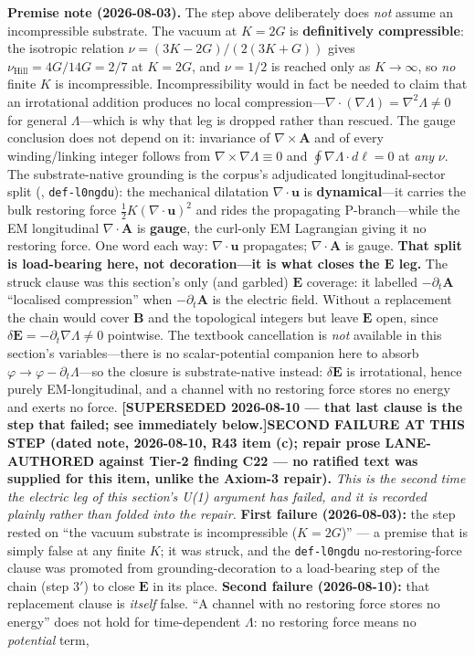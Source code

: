 \noindent\textbf{Premise note (2026-08-03).} The step above deliberately does \emph{not} assume an incompressible substrate. The vacuum at $K = 2G$ is \textbf{definitively compressible}: the isotropic relation $\nu = (3K - 2G)/(2(3K+G))$ gives $\nu_{\text{Hill}} = 4G/14G = 2/7$ at $K = 2G$, and $\nu = 1/2$ is reached only as $K \to \infty$, so \emph{no} finite $K$ is incompressible. Incompressibility would in fact be needed to claim that an irrotational addition produces no local compression---$\nabla\cdot(\nabla\Lambda) = \nabla^2\Lambda \neq 0$ for general $\Lambda$---which is why that leg is dropped rather than rescued. The gauge conclusion does not depend on it: invariance of $\nabla\times\mathbf{A}$ and of every winding/linking integer follows from $\nabla\times\nabla\Lambda \equiv 0$ and $\oint\nabla\Lambda\cdot d\boldsymbol{\ell} = 0$ at \emph{any} $\nu$. The substrate-native grounding is the corpus's adjudicated longitudinal-sector split (, \texttt{def-l0ngdu}): the mechanical dilatation $\nabla\cdot\mathbf{u}$ is \textbf{dynamical}---it carries the bulk restoring force $\tfrac12 K(\nabla\cdot\mathbf{u})^2$ and rides the propagating P-branch---while the EM longitudinal $\nabla\cdot\mathbf{A}$ is \textbf{gauge}, the curl-only EM Lagrangian giving it no restoring force. One word each way: $\nabla\cdot\mathbf{u}$ propagates; $\nabla\cdot\mathbf{A}$ is gauge. \textbf{That split is load-bearing here, not decoration---it is what closes the $\mathbf{E}$ leg.} The struck clause was this section's only (and garbled) $\mathbf{E}$ coverage: it labelled $-\partial_t\mathbf{A}$ ``localised compression'' when $-\partial_t\mathbf{A}$ is the electric field. Without a replacement the chain would cover $\mathbf{B}$ and the topological integers but leave $\mathbf{E}$ open, since $\delta\mathbf{E} = -\partial_t\nabla\Lambda \neq 0$ pointwise. The textbook cancellation is \emph{not} available in this section's variables---there is no scalar-potential companion here to absorb $\varphi \to \varphi - \partial_t\Lambda$---so the closure is substrate-native instead: $\delta\mathbf{E}$ is irrotational, hence purely EM-longitudinal, and a channel with no restoring force stores no energy and exerts no force. \textbf{[SUPERSEDED 2026-08-10 --- that last clause is the step that failed; see immediately below.]}\quad \textbf{SECOND FAILURE AT THIS STEP (dated note, 2026-08-10, R43 item (c); repair prose LANE-AUTHORED against Tier-2 finding C22 --- no ratified text was supplied for this item, unlike the Axiom-3 repair).} \emph{This is the second time the electric leg of this section's U(1) argument has failed, and it is recorded plainly rather than folded into the repair.} \textbf{First failure (2026-08-03):} the step rested on ``the vacuum substrate is incompressible ($K = 2G$)'' --- a premise that is simply false at any finite $K$; it was struck, and the \texttt{def-l0ngdu} no-restoring-force clause was promoted from grounding-decoration to a load-bearing step of the chain (step 3$'$) to close $\mathbf{E}$ in its place. \textbf{Second failure (2026-08-10):} that replacement clause is \emph{itself} false. ``A channel with no restoring force stores no energy'' does not hold for time-dependent $\Lambda$: no restoring force means no \emph{potential} term, 